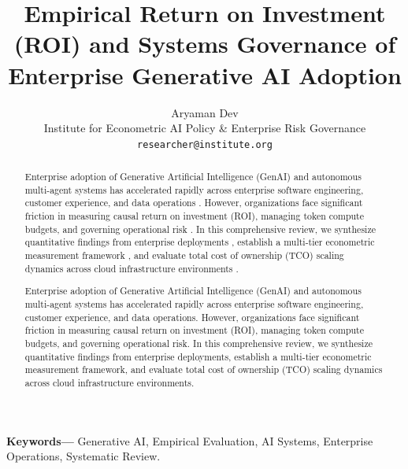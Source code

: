 \documentclass[10pt,twocolumn,letterpaper]{article}
\begin{document}
\title{Empirical Return on Investment (ROI) and Systems Governance of Enterprise Generative AI Adoption}

\author{
Aryaman Dev\\
Institute for Econometric AI Policy \& Enterprise Risk Governance \\
\texttt{researcher@institute.org}
}

\maketitle

\begin{abstract}
Enterprise adoption of Generative Artificial Intelligence (GenAI) and autonomous multi-agent systems has accelerated rapidly across enterprise software engineering, customer experience, and data operations \cite{crossref_10_2139_ssrn_7052339,crossref_10_2139_ssrn_7133258}. However, organizations face significant friction in measuring causal return on investment (ROI), managing token compute budgets, and governing operational risk \cite{europepmc_ppr1166729,crossref_10_2139_ssrn_6374778}. In this comprehensive review, we synthesize quantitative findings from enterprise deployments \cite{crossref_10_2139_ssrn_6323178,crossref_10_1201_9788743808145_14}, establish a multi-tier econometric measurement framework \cite{openalex_w4400993506}, and evaluate total cost of ownership (TCO) scaling dynamics across cloud infrastructure environments \cite{crossref_10_36948_ijfmr_2023_v05i01_19579,doaj_1f8a15781bc84c56b7274d1630b4cb88}.

Enterprise adoption of Generative Artificial Intelligence (GenAI) and autonomous multi-agent systems has accelerated rapidly across enterprise software engineering, customer experience, and data operations. However, organizations face significant friction in measuring causal return on investment (ROI), managing token compute budgets, and governing operational risk. In this comprehensive review, we synthesize quantitative findings from enterprise deployments, establish a multi-tier econometric measurement framework, and evaluate total cost of ownership (TCO) scaling dynamics across cloud infrastructure environments.
\end{abstract}

\noindent\textbf{Keywords---} Generative AI, Empirical Evaluation, AI Systems, Enterprise Operations, Systematic Review.
\end{document}
